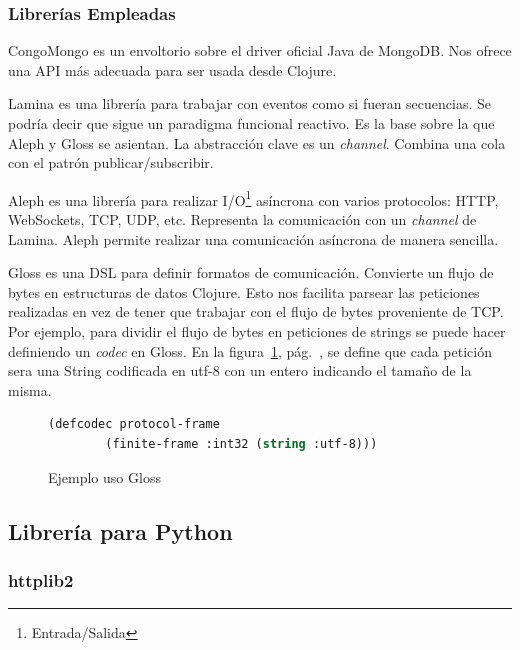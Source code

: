 \subsubsection{Librerías Empleadas}
\begin{description}
\item{CongoMongo}\cite{CONGO-MONGO} es un envoltorio sobre el driver
  oficial Java de MongoDB. Nos ofrece una API más adecuada para ser
  usada desde Clojure.
\item{Lamina} es una librería para trabajar con eventos como si fueran
  secuencias. Se podría decir que sigue un paradigma funcional
  reactivo\cite{FRP}. Es la base sobre la que Aleph y Gloss se
  asientan. La abstracción clave es un \emph{channel}. Combina una
  cola con el patrón publicar/subscribir.
\item{Aleph} es una librería para realizar
  I/O\footnote{Entrada/Salida} asíncrona con varios protocolos: HTTP,
  WebSockets, TCP, UDP, etc. Representa la comunicación con un
  \emph{channel} de Lamina. Aleph permite realizar una comunicación
  asíncrona de manera sencilla.
\item{Gloss} es una DSL para definir formatos de
  comunicación. Convierte un flujo de bytes en estructuras de datos
  Clojure. Esto nos facilita parsear las peticiones realizadas en vez
  de tener que trabajar con el flujo de bytes proveniente de TCP. Por
  ejemplo, para dividir el flujo de bytes en peticiones de strings se
  puede hacer definiendo un \emph{codec} en Gloss. En la
  figura~\ref{gloss-example}, pág.~\pageref{gloss-example}, se define
  que cada petición sera una String codificada en utf-8 con un entero
  indicando el tamaño de la misma.
  \begin{figure}[hb]
    \begin{center}
      \begin{lstlisting}[language=Lisp]
      (defcodec protocol-frame
        (finite-frame :int32 (string :utf-8)))
        \end{lstlisting}
    \end{center}
  \caption{Ejemplo uso Gloss}\label{gloss-example}
  \end{figure}
\end{description}

\subsection{Librería para Python}
\subsubsection{httplib2}
